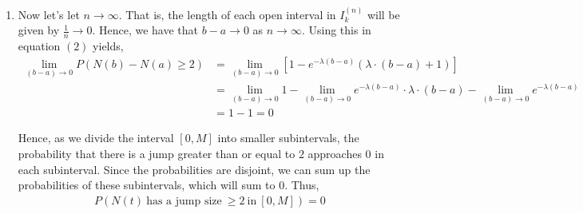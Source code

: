 \documentclass[12pt]{article}
\begin{document}
\begin{enumerate}[label=(\Alph*)]
\item Now let's let $n \to \infty$. That is, the length of each open interval in $I_k^{(n)}$ will be given by $\frac{1}{n} \to 0$. Hence, we have that $b - a \to 0$ as $n \to \infty$. Using this in equation $(2)$ yields,
\begin{align*}
\lim_{(b-a) \to 0} P(N(b) - N(a) \geq 2) &= \lim_{(b-a) \to 0} [1 - e^{-\lambda (b-a)}  \left( \lambda \cdot (b-a) + 1 \right)]\\
&=  \lim_{(b-a) \to 0} 1 -  \lim_{(b-a) \to 0} e^{-\lambda (b-a)} \cdot \lambda \cdot (b-a) - \lim_{(b-a) \to 0} e^{-\lambda (b-a)}\\
&= 1 - 1 = 0
\end{align*}

Hence, as we divide the interval $[0, M]$ into smaller subintervals, the probability that there is a jump greater than or equal to $2$ approaches $0$ in each subinterval. Since the probabilities are disjoint, we can sum up the probabilities of these subintervals, which will sum to $0$. Thus,
\begin{align*}
P(N(t) \ \text{has a jump size} \ \geq 2 \ \text{in} \ [0, M]) = 0
\end{align*}
\end{enumerate}
\end{document}
